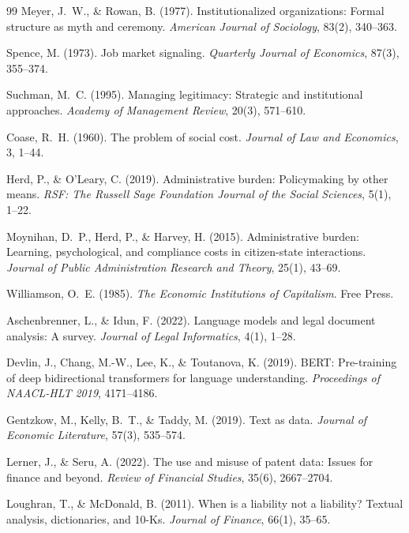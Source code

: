 \documentclass[12pt]{article}
\begin{document}
\begin{thebibliography}{99}
Meyer, J.~W., \& Rowan, B. (1977). Institutionalized organizations: Formal structure
as myth and ceremony. \textit{American Journal of Sociology}, 83(2), 340--363.

Spence, M. (1973). Job market signaling. \textit{Quarterly Journal of Economics},
87(3), 355--374.

Suchman, M.~C. (1995). Managing legitimacy: Strategic and institutional approaches.
\textit{Academy of Management Review}, 20(3), 571--610.

Coase, R.~H. (1960). The problem of social cost. \textit{Journal of Law and Economics},
3, 1--44.

Herd, P., \& O'Leary, C. (2019). Administrative burden: Policymaking by other means.
\textit{RSF: The Russell Sage Foundation Journal of the Social Sciences}, 5(1), 1--22.

Moynihan, D.~P., Herd, P., \& Harvey, H. (2015). Administrative burden: Learning,
psychological, and compliance costs in citizen-state interactions. \textit{Journal of
Public Administration Research and Theory}, 25(1), 43--69.

Williamson, O.~E. (1985). \textit{The Economic Institutions of Capitalism}. Free Press.

Aschenbrenner, L., \& Idun, F. (2022). Language models and legal document analysis:
A survey. \textit{Journal of Legal Informatics}, 4(1), 1--28.

Devlin, J., Chang, M.-W., Lee, K., \& Toutanova, K. (2019). BERT: Pre-training of
deep bidirectional transformers for language understanding. \textit{Proceedings of
NAACL-HLT 2019}, 4171--4186.

Gentzkow, M., Kelly, B.~T., \& Taddy, M. (2019). Text as data. \textit{Journal of
Economic Literature}, 57(3), 535--574.

Lerner, J., \& Seru, A. (2022). The use and misuse of patent data: Issues for finance
and beyond. \textit{Review of Financial Studies}, 35(6), 2667--2704.

Loughran, T., \& McDonald, B. (2011). When is a liability not a liability? Textual
analysis, dictionaries, and 10-Ks. \textit{Journal of Finance}, 66(1), 35--65.


\end{thebibliography}
\end{document}
